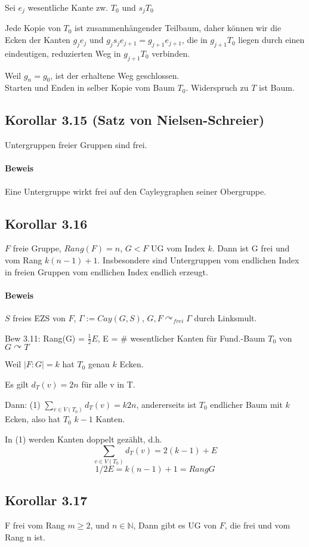 \documentclass{article}
\newcommand{\N}{\mathbb{N}}
\begin{document}
Sei $e_j$ wesentliche Kante zw. $T_0$ und $s_jT_0$

Jede Kopie von $T_0$ ist zusammenhängender Teilbaum, daher können wir die Ecken der Kanten $g_je_j$ und $g_js_je_{j+1} = g_{j+1}e_{j+1}$, die in $g_{j+1}T_0$ liegen durch einen eindeutigen, reduzierten Weg in $g_{j+1}T_0$ verbinden.

Weil $g_n = g_0$, ist der erhaltene Weg geschlossen.\\
Starten und Enden in selber Kopie vom Baum $T_0$. Widerspruch zu $T$ ist Baum.

\subsection{Korollar 3.15 (Satz von Nielsen-Schreier)} Untergruppen freier Gruppen sind frei.
\paragraph{Beweis} Eine Untergruppe wirkt frei auf den Cayleygraphen seiner Obergruppe.

\subsection{Korollar 3.16} $F$ freie Gruppe, $Rang(F) = n$, $G < F$ UG vom Index $k$. Dann ist G frei und vom Rang $k(n-1) + 1$. Insbesondere sind Untergruppen vom endlichen Index in freien Gruppen vom endlichen Index endlich erzeugt.
\paragraph{Beweis} $S$ freies EZS von $F$, $\Gamma:= Cay(G,S)$, $G,F \curvearrowright_{frei} \Gamma$ durch Linksmult.

Bew 3.11: Rang(G) = $\frac{1}{2} E$, E = \# wesentlicher Kanten für Fund.-Baum $T_0$ von $G \curvearrowright T$

Weil $|F:G| = k$ hat $T_0$ genau $k$ Ecken.

Es gilt $d_T(v) = 2n$ für alle v in T.

Dann: (1) $\sum_{v\in V(T_0)} d_T(v) = k 2n$, andererseits ist $T_0$ endlicher Baum mit $k$ Ecken, also hat $T_0$ $k-1$ Kanten.

In (1) werden Kanten doppelt gezählt, d.h.
\[\sum_{v\in V(T_0)}d_T(v) = 2(k-1) + E\]
\[1/2 E = k(n-1) + 1 = Rang G\]

\subsection{Korollar 3.17}
F frei vom Rang $m \geq 2$, und $n\in \N$, Dann gibt es UG von $F$, die frei und vom Rang n ist.
\end{document}
